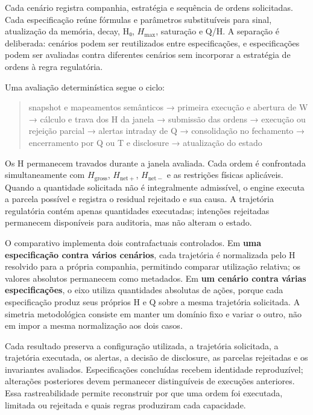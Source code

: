 \documentclass[
  a4paper,
]{article}
\begin{document}
Cada cenário registra companhia, estratégia e sequência de ordens
solicitadas. Cada especificação reúne fórmulas e parâmetros
substituíveis para sinal, atualização da memória, decay, H₀,
\(H_{\max}\), saturação e Q/H. A separação é deliberada: cenários podem
ser reutilizados entre especificações, e especificações podem ser
avaliadas contra diferentes cenários sem incorporar a estratégia de
ordens à regra regulatória.

Uma avaliação determinística segue o ciclo:

\begin{quote}
snapshot e mapeamentos semânticos → primeira execução e abertura de W →
cálculo e trava dos H da janela → submissão das ordens → execução ou
rejeição parcial → alertas intraday de Q → consolidação no fechamento →
encerramento por Q ou T e disclosure → atualização do estado
\end{quote}

Os H permanecem travados durante a janela avaliada. Cada ordem é
confrontada simultaneamente com \(H_{\mathrm{gross}}\),
\(H_{\mathrm{net}+}\), \(H_{\mathrm{net}-}\) e as restrições físicas
aplicáveis. Quando a quantidade solicitada não é integralmente
admissível, o engine executa a parcela possível e registra o residual
rejeitado e sua causa. A trajetória regulatória contém apenas
quantidades executadas; intenções rejeitadas permanecem disponíveis para
auditoria, mas não alteram o estado.

O comparativo implementa dois contrafactuais controlados. Em \textbf{uma
especificação contra vários cenários}, cada trajetória é normalizada
pelo H resolvido para a própria companhia, permitindo comparar
utilização relativa; os valores absolutos permanecem como metadados. Em
\textbf{um cenário contra várias especificações}, o eixo utiliza
quantidades absolutas de ações, porque cada especificação produz seus
próprios H e Q sobre a mesma trajetória solicitada. A simetria
metodológica consiste em manter um domínio fixo e variar o outro, não em
impor a mesma normalização aos dois casos.

Cada resultado preserva a configuração utilizada, a trajetória
solicitada, a trajetória executada, os alertas, a decisão de disclosure,
as parcelas rejeitadas e os invariantes avaliados. Especificações
concluídas recebem identidade reproduzível; alterações posteriores devem
permanecer distinguíveis de execuções anteriores. Essa rastreabilidade
permite reconstruir por que uma ordem foi executada, limitada ou
rejeitada e quais regras produziram cada capacidade.
\end{document}
